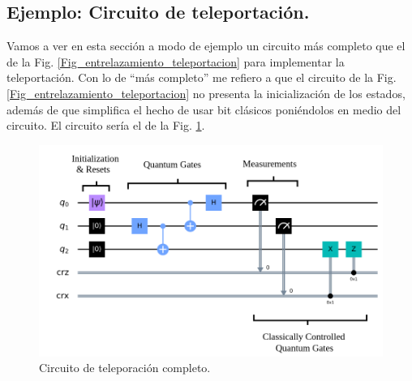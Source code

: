 \documentclass[a4paper,11pt]{book} %
\numberwithin{equation}{chapter}
\begin{document}
		\subsection{Ejemplo: Circuito de teleportación.}

Vamos a ver en esta sección a modo de ejemplo un circuito más completo que el de la Fig. \ref{Fig_entrelazamiento_teleportacion} para implementar la teleportación. Con lo de ``más completo'' me refiero a que el circuito de la Fig. \ref{Fig_entrelazamiento_teleportacion} no presenta la inicialización de los estados, además de que simplifica el hecho de usar bit clásicos poniéndolos en medio del circuito. El circuito sería el de la Fig. \ref{Fig_elementos_teleportacion}.

	\begin{figure}[H]
	\centering 
	\includegraphics[width=0.7\linewidth]{Figuras/Fig_elementos_teleportacion.png}
	\caption{Circuito de teleporación completo.}
	\label{Fig_elementos_teleportacion}
	\end{figure}
\end{document}
